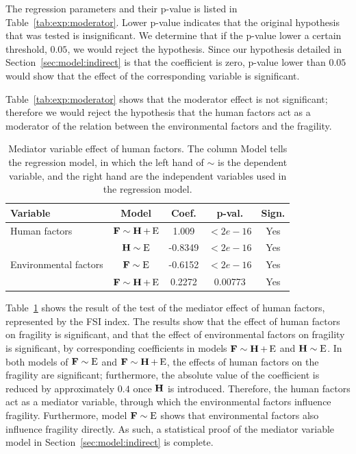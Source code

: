 The regression parameters and their p-value is listed in Table~\ref{tab:exp:moderator}. Lower p-value indicates that the original hypothesis that was tested is insignificant. We determine that if the p-value lower a certain threshold, $0.05$, we would reject the hypothesis. Since our hypothesis detailed in Section~\ref{sec:model:indirect} is that the coefficient is zero, p-value lower than $0.05$ would show that the effect of the corresponding variable is significant.

Table~\ref{tab:exp:moderator} shows that the moderator effect is not significant; therefore we would reject the hypothesis that the human factors act as a moderator of the relation between the environmental factors and the fragility.

\begin{table}[htbp]
    \centering
    \begin{tabular}{|l|cccc|} \hline
        Variable & Model & Coef. & p-val. & Sign.  \\ \hline
        Human factors & $\operatorname*{\mathbf{F}}\sim\operatorname*{\mathbf{H}} + \operatorname*{E}$ & 1.009 & $<2e-16$ & Yes  \\ \hline        
        \multirow{3}{*}{Environmental factors} & $\operatorname*{\mathbf{H}}\sim\operatorname*{E}$ & -0.8349 & $<2e-16$ & Yes \\ \cline{2-5}
        & $\operatorname*{\mathbf{F}}\sim\operatorname*{E}$ & -0.6152 & $<2e-16$ & Yes \\ \cline{2-5}
        & $\operatorname*{\mathbf{F}}\sim\operatorname*{\mathbf{H}}+\operatorname*{E}$ & 0.2272 & 0.00773 & Yes \\ \hline        
    \end{tabular}
    \caption{Mediator variable effect of human factors. The column Model tells the regression model, in which the left hand of $\sim$ is the dependent variable, and the right hand are the independent variables used in the regression model.}
    \label{tab:exp:mediator:general}
\end{table}
    
Table~\ref{tab:exp:mediator:general} shows the result of the test of the mediator effect of human factors, represented by the FSI index. The results show that the effect of human factors on fragility is significant, and that the effect of environmental factors on fragility is significant, by corresponding coefficients in models $\operatorname*{\mathbf{F}}\sim\operatorname*{\mathbf{H}}+\operatorname*{E}$ and $\operatorname*{\mathbf{H}}\sim\operatorname*{E}$. In both models of $\operatorname*{\mathbf{F}}\sim\operatorname*{E}$ and $\operatorname*{\mathbf{F}}\sim\operatorname*{\mathbf{H}}+\operatorname*{E}$, the effects of human factors on the fragility are significant; furthermore, the absolute value of the coefficient is reduced by approximately $0.4$ once $\operatorname*{\mathbf{H}}$ is introduced. Therefore, the human factors act as a mediator variable, through which the environmental factors influence fragility. Furthermore, model $\operatorname*{\mathbf{F}}\sim\operatorname*{E}$ shows that environmental factors also influence fragility directly. As such, a statistical proof of the mediator variable model in Section~\ref{sec:model:indirect} is complete.

